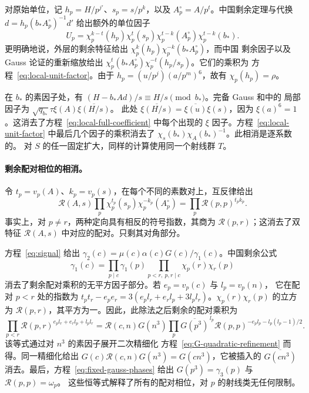对原始单位，记 $h_p=H/p^{j'}$、$s_p=s/p^k$，以及
$A_p^\circ=A/p^t$。中国剩余定理与代换
$d=h_p(b_*A_p^\circ)^{-1}d'$ 给出额外的单位因子
\begin{equation}\label{eq:local-unit-factor}
 U_p=\chi_p^{k-t}(h_p)\chi_p^t(s_p)
       \chi_p^{t-k}(A_p^\circ)\chi_p^{t-k}(b_*).
\end{equation}
更明确地说，外层的剩余特征给出
$\chi_p^k(h_p)\chi_p^{-k}(b_*A_p^\circ)$，而中国
剩余因子以及 Gauss 论证的重新缩放给出
$\chi_p^t(b_*A_p^\circ)\chi_p^{-t}(h_p/s_p)$。它们的乘积为
方程~\eqref{eq:local-unit-factor}。由于
$h_p=(u/p^j)(a/p^m)^6$，故有 $\chi_p(h_p)=\rho$。

在 $b_*$ 的素因子处，有
$(H-b_*Ad)/s\equiv H/s\pmod {b_*}$。完备 Gauss 和中的
局部因子为
$\sqrt{q_{b_*}}\tau\xi(A)\overline{\xi(H/s)}$。
此处 $\overline{\xi(H/s)}=\overline{\xi(u)}\xi(s)$，因为
$\xi(a)^6=1$。这消去了方程~\eqref{eq:local-full-coefficient}
中每个出现的 $\xi$ 因子。方程~\eqref{eq:local-unit-factor}
中最后几个因子的乘积消去了
$\chi_s(b_*)\chi_A(b_*)^{-1}$。此相消是逐系数的。
对 $S$ 的任一固定扩大，同样的计算使用同一个射线群 $T$。

\paragraph{剩余配对相位的相消。}
令 $t_p=v_p(A)$、$k_p=v_p(s)$，在每个不同的素数对上，互反律给出
\[
 \mathcal R(A,s)\prod_p
       \chi_p^{t_p}(s_p)\chi_p^{-k_p}(A_p^\circ)
       =\prod_p\mathcal R(p,p)^{t_pk_p}.
\]
事实上，对 $p\ne r$，两种定向具有相反的符号指数，其商为
$\mathcal R(p,r)$；这消去了双特征 $\mathcal R(A,s)$ 中对应的配对。只剩其对角部分。

方程~\eqref{eq:signal} 给出
$\gamma_2(c)=\mu(c)\alpha(c)G(c)/\gamma_1(c)$。中国剩余公式
\[
 \gamma_1(c)=\prod_{p\mid c}\gamma_1(p)
             \prod_{p<r,\ p,r\mid c}\chi_p(r)\chi_r(p)
\]
消去了剩余配对乘积的无平方因子部分。若 $e_p=v_p(c)$ 与 $l_p=v_p(n)$，
它在配对 $p<r$ 处的指数为
$t_pt_r-e_pe_r=3(e_pl_r+e_rl_p+3l_pl_r)$。$\chi_p(r)\chi_r(p)$
的立方为 $\mathcal R(p,r)$，其平方为一。因此，此除法之后剩余的配对乘积为
\[
 \prod_{p<r}\mathcal R(p,r)^{e_pl_r+e_rl_p+l_pl_r}
 =\mathcal R(c,n)G(n^3)
   \prod_p\overline{G(p^3)}^{\,l_p}
            \mathcal R(p,p)^{-e_pl_p-l_p(l_p-1)/2}.
\]
该等式通过对 $n^3$ 的素因子展开二次精细化
方程~\eqref{eq:G-quadratic-refinement} 而得。同一精细化给出
$G(c)\mathcal R(c,n)G(n^3)=G(cn^3)$，它被插入的
$\overline{G(cn^3)}$ 消去。最后，方程~\eqref{eq:fixed-gauss-phases}
给出 $G(p^3)=\gamma_3(p)$ 与 $\mathcal R(p,p)=\omega_p$。
这些恒等式解释了所有的配对相位，对 $p$ 的射线类无任何限制。

